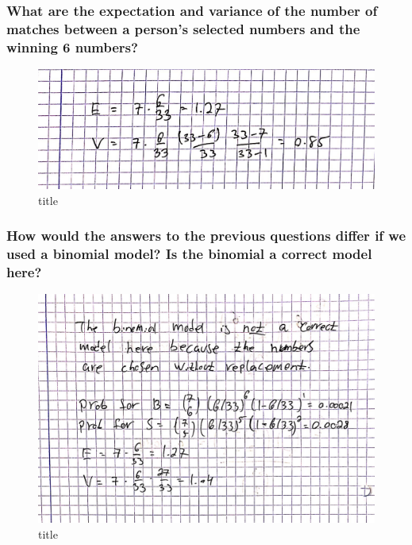 \documentclass[11pt]{article}
\makeatletter
\def\maxwidth{\ifdim\Gin@nat@width>\linewidth\linewidth
    \else\Gin@nat@width\fi}
\let\Oldincludegraphics\includegraphics
\renewcommand{\includegraphics}[1]{\Oldincludegraphics[width=.8\maxwidth]{#1}}
\makeatother
\begin{document}
    \hypertarget{what-are-the-expectation-and-variance-of-the-number-of-matches-between-a-persons-selected-numbers-and-the-winning-6-numbers}{%
\subsubsection{What are the expectation and variance of the number of
matches between a person's selected numbers and the winning 6
numbers?}\label{what-are-the-expectation-and-variance-of-the-number-of-matches-between-a-persons-selected-numbers-and-the-winning-6-numbers}}

    \begin{figure}
\centering
\includegraphics{3-3.JPG}
\caption{title}
\end{figure}

    \hypertarget{how-would-the-answers-to-the-previous-questions-differ-if-we-used-a-binomial-model-is-the-binomial-a-correct-model-here}{%
\subsubsection{How would the answers to the previous questions differ if
we used a binomial model? Is the binomial a correct model
here?}\label{how-would-the-answers-to-the-previous-questions-differ-if-we-used-a-binomial-model-is-the-binomial-a-correct-model-here}}

    \begin{figure}
\centering
\includegraphics{3-4.JPG}
\caption{title}
\end{figure}
\end{document}
